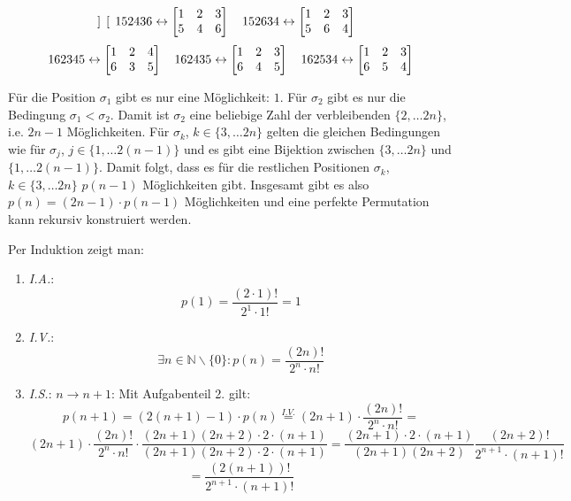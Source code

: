 \begin{flushenum}
\[\begin{bmatrix}
		\end{bmatrix} \quad
		152436 \leftrightarrow
		\begin{bmatrix}
			1 & 2 & 3 \\
			5 & 4 & 6 \\
		\end{bmatrix} \quad
		152634 \leftrightarrow
		\begin{bmatrix}
			1 & 2 & 3 \\
			5 & 6 & 4 \\
		\end{bmatrix}
	\]
	\[
		162345 \leftrightarrow
		\begin{bmatrix}
			1 & 2 & 4 \\
			6 & 3 & 5 \\
		\end{bmatrix} \quad
		162435 \leftrightarrow
		\begin{bmatrix}
			1 & 2 & 3 \\
			6 & 4 & 5 \\
		\end{bmatrix} \quad
		162534 \leftrightarrow
		\begin{bmatrix}
			1 & 2 & 3 \\
			6 & 5 & 4 \\
		\end{bmatrix}
	\]

\item
	Für die Position $\sigma_1$ gibt es nur eine Möglichkeit: $1$. Für $\sigma_2$ gibt es nur die Bedingung $\sigma_1 < \sigma_2$.
	Damit ist $\sigma_2$ eine beliebige Zahl der verbleibenden $\{2, \ldots 2n\}$, i.e. $2n-1$ Möglichkeiten.
	Für $\sigma_k$, $k \in \{3, \ldots 2n\}$ gelten die gleichen Bedingungen wie für $\sigma_j$, $j \in \{1, \ldots 2(n-1)\}$ und es gibt eine
	Bijektion zwischen $\{3, \ldots 2n\}$ und $\{1, \ldots 2(n-1)\}$. Damit folgt, dass es für die restlichen Positionen $\sigma_k$, $k \in \{3, \ldots 2n\}$
	$p(n-1)$ Möglichkeiten gibt. Insgesamt gibt es also $p(n) = (2n - 1)\cdot p(n-1)$ Möglichkeiten und eine perfekte Permutation kann rekursiv konstruiert werden.

\item
	Per Induktion zeigt man:
	\begin{enumerate}
		\item \textit{I.A.}: \[ p(1) = \frac{(2 \cdot 1)!}{2^1 \cdot 1!} = 1 \]
		\item \textit{I.V.}: \[ \exists n \in \mathbb{N}\backslash\{0\}: p(n) = \frac{(2n)!}{2^n \cdot n!} \]
		\item \textit{I.S.}: $ n \rightarrow n+1$: Mit Aufgabenteil 2. gilt:
			\[ p(n+1) = (2 (n+1) - 1) \cdot p(n) \overset{I.V.}{=} (2n + 1) \cdot \frac{(2n)!}{2^n \cdot n!} = \]
			\[ (2n + 1) \cdot \frac{(2n)!}{2^n \cdot n!} \cdot \frac{(2n + 1)(2n + 2)\cdot 2 \cdot (n+1)}{(2n+1)(2n + 2) \cdot2 \cdot (n+1)} = 
			   \frac{(2n+1) \cdot 2 \cdot (n+1)}{(2n + 1) (2n +2)}\frac{(2n+2)!}{2^{n+1} \cdot (n+1)!} \]
			\[ = \frac{(2(n+1))!}{2^{n+1}\cdot (n+1)!} \]
	\end{enumerate}


\end{flushenum}
